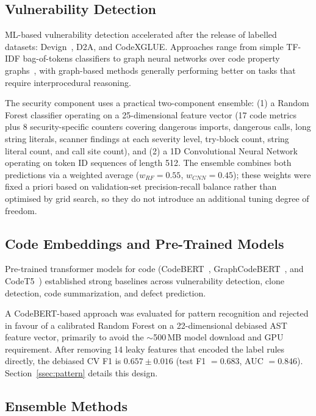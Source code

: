 \documentclass[12pt, oneside]{report}
\begin{document}
\subsection{Vulnerability Detection}

ML-based vulnerability detection accelerated after the release of labelled datasets:
Devign~\cite{zhou2019}, D2A, and CodeXGLUE. Approaches range from simple TF-IDF
bag-of-tokens classifiers to graph neural networks over code property
graphs~\cite{yamaguchi2014}, with graph-based methods generally performing better on
tasks that require interprocedural reasoning.

The security component uses a practical two-component ensemble: (1) a Random Forest classifier
operating on a 25-dimensional feature vector (17 code metrics plus 8 security-specific counters
covering dangerous imports, dangerous calls, long string literals, scanner findings at each
severity level, try-block count, string literal count, and call site count), and (2) a 1D
Convolutional Neural Network operating on token ID sequences of length 512.
The ensemble combines both predictions via a weighted average ($w_{RF}=0.55$, $w_{CNN}=0.45$);
these weights were fixed a priori based on validation-set precision-recall balance rather than
optimised by grid search, so they do not introduce an additional tuning degree of freedom.

\subsection{Code Embeddings and Pre-Trained Models}

Pre-trained transformer models for code (CodeBERT~\cite{feng2020}, GraphCodeBERT~\cite{guo2021}, and CodeT5~\cite{wang2021}) established strong baselines across vulnerability detection, clone detection, code summarization, and defect prediction.

A CodeBERT-based approach was evaluated for pattern recognition and rejected in favour of a calibrated Random Forest on a 22-dimensional debiased AST feature vector, primarily to avoid the $\sim$500\,MB model download and GPU requirement. After removing 14 leaky features that encoded the label rules directly, the debiased CV F1 is $0.657 \pm 0.016$ (test F1 $= 0.683$, AUC $= 0.846$). Section~\ref{ssec:pattern} details this design.

\subsection{Ensemble Methods}
\end{document}
